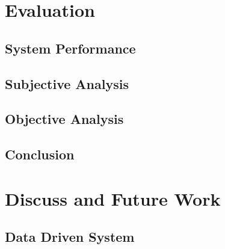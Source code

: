 \documentclass[bsc,frontabs,twoside,singlespacing,parskip]{infthesis}
\begin{document}
\section{}
\chapter{Evaluation}
\section{System Performance}
\section{Subjective Analysis}
\section{Objective Analysis}
\section{Conclusion}
\chapter{Discuss and Future Work}
\section{Data Driven System}



\end{document}
